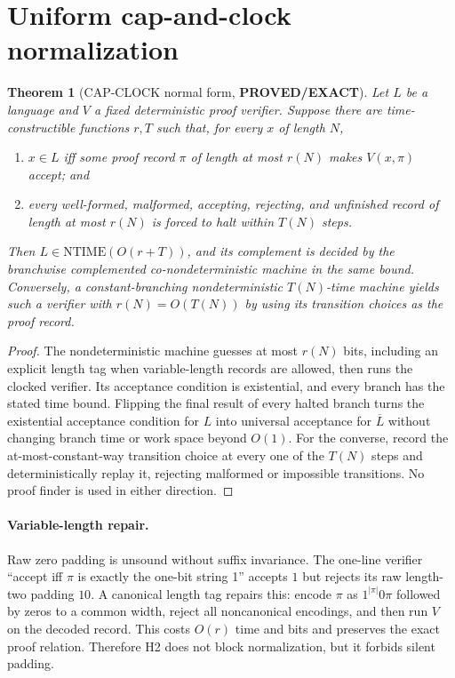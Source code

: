 \documentclass[11pt]{article}
\newtheorem{theorem}{Theorem}
\newcommand{\status}[1]{\textbf{#1}}
\begin{document}
\section{Uniform cap-and-clock normalization}

\begin{theorem}[CAP-CLOCK normal form, \status{PROVED/EXACT}]\label{th:cap}
Let $L$ be a language and $V$ a fixed deterministic proof verifier.  Suppose
there are time-constructible functions $r,T$ such that, for every $x$ of
length $N$,
\begin{enumerate}
\item $x\in L$ iff some proof record $\pi$ of length at most $r(N)$ makes
      $V(x,\pi)$ accept; and
\item every well-formed, malformed, accepting, rejecting, and unfinished
      record of length at most $r(N)$ is forced to halt within $T(N)$ steps.
\end{enumerate}
Then $L\in\mathrm{NTIME}(O(r+T))$, and its complement is decided by the
branchwise complemented co-nondeterministic machine in the same bound.
Conversely, a constant-branching nondeterministic $T(N)$-time machine yields
such a verifier with $r(N)=O(T(N))$ by using its transition choices as the
proof record.
\end{theorem}

\begin{proof}
The nondeterministic machine guesses at most $r(N)$ bits, including an
explicit length tag when variable-length records are allowed, then runs the
clocked verifier.  Its acceptance condition is existential, and every branch
has the stated time bound.  Flipping the final result of every halted branch
turns the existential acceptance condition for $L$ into universal acceptance
for $\overline L$ without changing branch time or work space beyond $O(1)$.
For the converse, record the at-most-constant-way transition choice at every
one of the $T(N)$ steps and deterministically replay it, rejecting malformed
or impossible transitions.  No proof finder is used in either direction.
\end{proof}

\paragraph{Variable-length repair.}
Raw zero padding is unsound without suffix invariance.  The one-line verifier
``accept iff $\pi$ is exactly the one-bit string 1'' accepts $1$ but rejects
its raw length-two padding $10$.  A canonical length tag repairs this: encode
$\pi$ as $1^{|\pi|}0\pi$ followed by zeros to a common width, reject all
noncanonical encodings, and then run $V$ on the decoded record.  This costs
$O(r)$ time and bits and preserves the exact proof relation.  Therefore H2
does not block normalization, but it forbids silent padding.
\end{document}
